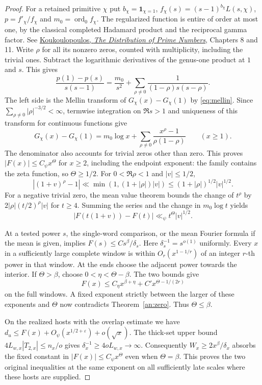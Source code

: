 \begin{proof}
For a retained primitive \(\chi\) put \(b_\chi=\mathbf1_{\chi=1}\),
\(f_\chi(s)=(s-1)^{b_\chi}L(s,\chi)\), \(p=f'_\chi/f_\chi\) and
\(m_0=\operatorname{ord}_0 f_\chi\). The regularized function is entire
of order at most one, by the classical completed Hadamard product
and the reciprocal gamma factor. See
\href{https://dms.umontreal.ca/~koukoulo/documents/publications/primes.pdf}{Koukoulopoulos,
\emph{The Distribution of Prime Numbers}}, Chapters 8 and 11.
Write \(\rho\) for all its nonzero zeros, counted with multiplicity,
including the trivial ones. Subtract the logarithmic derivatives of
the genus-one product at \(1\) and \(s\). This gives
\[
 \frac{p(1)-p(s)}{s(s-1)}
    =\frac{m_0}{s^2}
       +\sum_{\rho\ne0}\frac{1}{(1-\rho)s(s-\rho)}.
\]
The left side is the Mellin transform of \(G_\chi(x)-G_\chi(1)\)
by \eqref{eq:mellin}. Since \(\sum_{\rho\ne0}|\rho|^{-3/2}<\infty\),
termwise integration on \(\Re s>1\) and uniqueness of this transform
for continuous functions give
\[
 G_\chi(x)-G_\chi(1)=m_0\log x+
             \sum_{\rho\ne0}\frac{x^\rho-1}{\rho(1-\rho)}
                    \qquad(x\ge1).
\]
The denominator also accounts for trivial zeros other than zero.
This proves \(|F(x)|\le C_\psi x^\Theta\) for \(x\ge2\), including
the endpoint exponent: the family contains the zeta function, so
\(\Theta\ge1/2\). For \(0<\Re\rho<1\) and \(|v|\le1/2\),
\[
 |(1+v)^\rho-1|\ll
   \min(1,(1+|\rho|)|v|)\le (1+|\rho|)^{1/2}|v|^{1/2}.
\]
For a negative trivial zero, the mean value theorem bounds the change
of \(t^\rho\) by \(2|\rho|(t/2)^\rho |v|\) for \(t\ge4\).
Summing the series and the change in \(m_0\log t\) yields
\[
    |F(t(1+v))-F(t)|\ll_\psi t^\Theta |v|^{1/2}.
\]

At a tested power \(s\), the single-word comparison, or the mean
Fourier formula if the mean is given, implies
\(F(s)\le C s^\beta/\delta_s\). Here \(\delta_s^{-1}=s^{o(1)}\)
uniformly. Every \(x\) in a sufficiently large complete window
is within \(O_r(x^{1-1/r})\) of an integer \(r\)-th power in that
window. At the ends choose the adjacent power towards the interior.
If \(\Theta>\beta\), choose \(0<\eta<\Theta-\beta\). The two bounds give
\[
 F(x)\le C_\eta x^{\beta+\eta}+C' x^{\Theta-1/(2r)}
\]
on the full windows. A fixed exponent strictly between the larger
of these exponents and \(\Theta\) now contradicts
Theorem~\ref{an:zero}. Thus \(\Theta\le\beta\).

On the realized hosts with the overlap estimate we have
\(d_u\le F(x)+O_\psi(x^{1/2+\varepsilon})+o(\sqrt{x})\).
The thick-set upper bound \(4 L_{w,x}|T_{2,x}|\le n_x/o\) gives
\(\delta_x^{-1}\ge4oL_{w,x}\to\infty\). Consequently
\(W_x\ge2x^\beta/\delta_x\) absorbs the fixed constant in
\(|F(x)|\le C_\psi x^\Theta\) even when \(\Theta=\beta\).
This proves the two original inequalities at the same exponent
on all sufficiently late scales where these hosts are supplied.
\end{proof}

